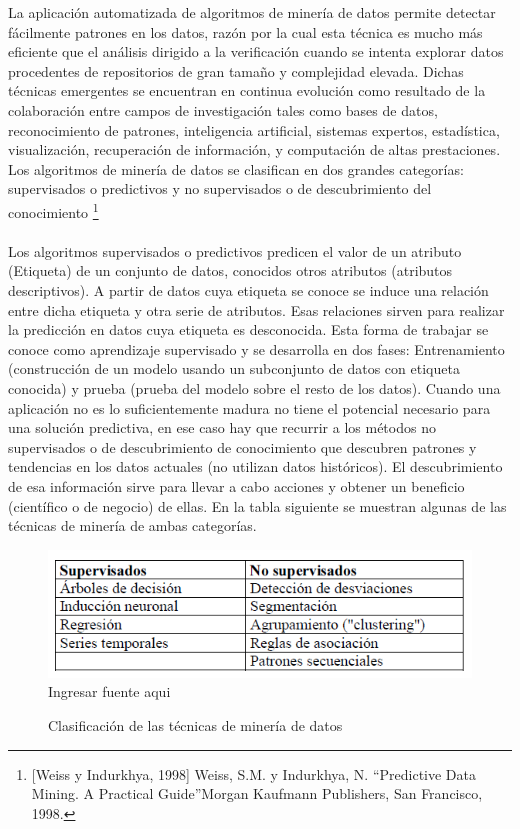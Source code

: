 \documentclass[a4paper,openright,12pt]{book}
\theoremstyle{definition}
\theoremstyle{remark}
\begin{document}
La aplicación automatizada de algoritmos de minería de datos permite detectar fácilmente patrones en los datos, razón por la cual esta técnica es mucho más eficiente que el análisis dirigido a la verificación cuando se intenta explorar datos procedentes de repositorios de gran tamaño y complejidad elevada. Dichas técnicas emergentes se encuentran en continua evolución como resultado de la colaboración entre campos de investigación tales como bases de datos, reconocimiento de patrones, inteligencia artificial, sistemas expertos, estadística, visualización, recuperación de información, y computación de altas prestaciones. Los algoritmos de minería de datos se clasifican en dos grandes categorías: supervisados o predictivos y no supervisados o de descubrimiento del conocimiento \footnote{[Weiss y Indurkhya, 1998] Weiss, S.M. y Indurkhya, N. “Predictive Data Mining. A Practical Guide”Morgan Kaufmann Publishers, San Francisco, 1998.}\\\\
Los algoritmos supervisados o predictivos predicen el valor de un atributo (Etiqueta) de un conjunto de datos, conocidos otros atributos (atributos descriptivos). A partir de datos cuya etiqueta se conoce se induce una relación entre dicha etiqueta y otra serie de atributos. Esas relaciones sirven para realizar la predicción en datos cuya etiqueta es desconocida. Esta forma de trabajar se conoce como aprendizaje supervisado y se desarrolla en dos fases: Entrenamiento (construcción de un modelo usando un subconjunto de datos con etiqueta conocida) y prueba (prueba del modelo sobre el resto de los datos). Cuando una aplicación no es lo suficientemente madura no tiene el potencial necesario para una solución predictiva, en ese caso hay que recurrir a los métodos no supervisados o de descubrimiento de  conocimiento que descubren patrones y tendencias en los datos actuales (no utilizan datos históricos). El descubrimiento de esa información sirve para llevar a cabo acciones y obtener un beneficio (científico o de negocio) de ellas. En la tabla siguiente se muestran algunas de las técnicas de minería de ambas categorías.

\begin{figure}[htb]
\centering
\caption{Clasificación de las técnicas de minería de datos} 
\includegraphics[scale=0.7]{Tabla1}
\label{fig:Tabla1}
\\Ingresar fuente aqui
\end{figure}
\end{document}
